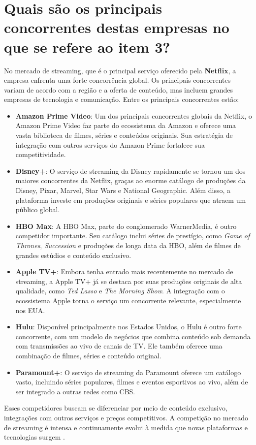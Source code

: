 \section{Quais são os principais concorrentes destas empresas no que se refere ao item 3?}

No mercado de streaming, que é o principal serviço oferecido pela \textbf{Netflix}, a empresa enfrenta uma forte concorrência global. Os principais concorrentes variam de acordo com a região e a oferta de conteúdo, mas incluem grandes empresas de tecnologia e comunicação. Entre os principais concorrentes estão:

\begin{itemize}
    \item \textbf{Amazon Prime Video}: Um dos principais concorrentes globais da Netflix, o Amazon Prime Video faz parte do ecossistema da Amazon e oferece uma vasta biblioteca de filmes, séries e conteúdos originais. Sua estratégia de integração com outros serviços do Amazon Prime fortalece sua competitividade.

    \item \textbf{Disney+}: O serviço de streaming da Disney rapidamente se tornou um dos maiores concorrentes da Netflix, graças ao enorme catálogo de produções da Disney, Pixar, Marvel, Star Wars e National Geographic. Além disso, a plataforma investe em produções originais e séries populares que atraem um público global.

    \item \textbf{HBO Max}: A HBO Max, parte do conglomerado WarnerMedia, é outro competidor importante. Seu catálogo inclui séries de prestígio, como \textit{Game of Thrones}, \textit{Succession} e produções de longa data da HBO, além de filmes de grandes estúdios e conteúdo exclusivo.

    \item \textbf{Apple TV+}: Embora tenha entrado mais recentemente no mercado de streaming, a Apple TV+ já se destaca por suas produções originais de alta qualidade, como \textit{Ted Lasso} e \textit{The Morning Show}. A integração com o ecossistema Apple torna o serviço um concorrente relevante, especialmente nos EUA.

    \item \textbf{Hulu}: Disponível principalmente nos Estados Unidos, o Hulu é outro forte concorrente, com um modelo de negócios que combina conteúdo sob demanda com transmissões ao vivo de canais de TV. Ele também oferece uma combinação de filmes, séries e conteúdo original.

    \item \textbf{Paramount+}: O serviço de streaming da Paramount oferece um catálogo vasto, incluindo séries populares, filmes e eventos esportivos ao vivo, além de ser integrado a outras redes como CBS.

\end{itemize}

Esses competidores buscam se diferenciar por meio de conteúdo exclusivo, integrações com outros serviços e preços competitivos. A competição no mercado de streaming é intensa e continuamente evolui à medida que novas plataformas e tecnologias surgem \cite{concorrentes_streaming}.